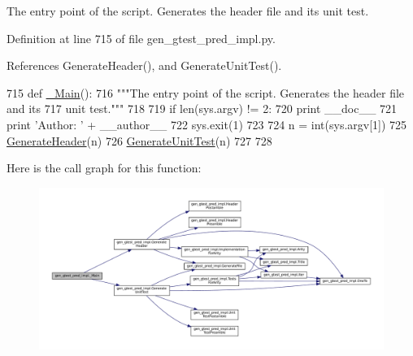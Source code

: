 \begin{DoxyVerb}The entry point of the script.  Generates the header file and its
unit test.\end{DoxyVerb}
 

Definition at line 715 of file gen\+\_\+gtest\+\_\+pred\+\_\+impl.\+py.



References Generate\+Header(), and Generate\+Unit\+Test().


\begin{DoxyCode}
715 \textcolor{keyword}{def }\hyperlink{namespacegen__gtest__pred__impl_a50dd74615a1507ce657c8fa24d7c161e}{\_Main}():
716   \textcolor{stringliteral}{"""The entry point of the script.  Generates the header file and its}
717 \textcolor{stringliteral}{  unit test."""}
718 
719   \textcolor{keywordflow}{if} len(sys.argv) != 2:
720     \textcolor{keywordflow}{print} \_\_doc\_\_
721     \textcolor{keywordflow}{print} \textcolor{stringliteral}{'Author: '} + \_\_author\_\_
722     sys.exit(1)
723 
724   n = int(sys.argv[1])
725   \hyperlink{namespacegen__gtest__pred__impl_a6f3039a82a5283846fb272f8a3af6743}{GenerateHeader}(n)
726   \hyperlink{namespacegen__gtest__pred__impl_acbd42b5b7fb7ddbb06a4dd58fc37e9ed}{GenerateUnitTest}(n)
727 
728 
\end{DoxyCode}
Here is the call graph for this function\+:
\nopagebreak
\begin{figure}[H]
\begin{center}
\leavevmode
\includegraphics[width=350pt]{namespacegen__gtest__pred__impl_a50dd74615a1507ce657c8fa24d7c161e_cgraph}
\end{center}
\end{figure}
\mbox{\label{namespacegen__gtest__pred__impl_a5bbb7272f3588b969ab3ded6f49836a1}} 

